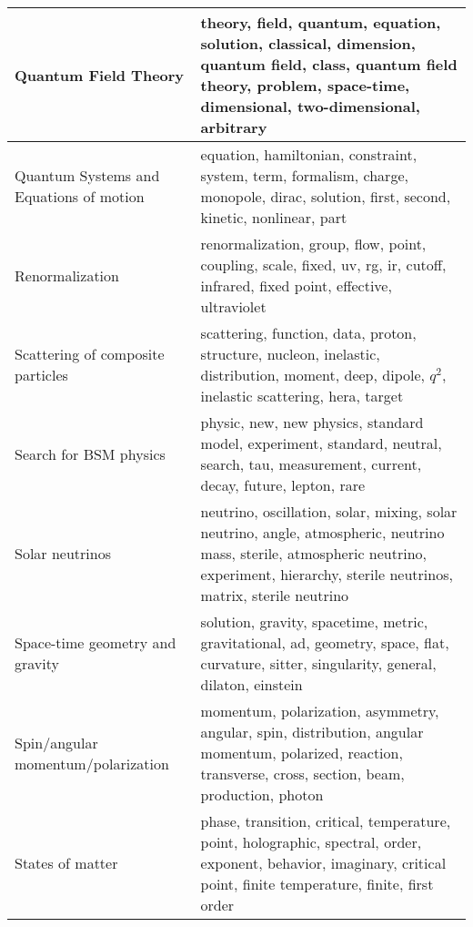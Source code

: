 \begin{longtable}[H]{p{}|p{}}
Quantum Field Theory                                &                                 theory, field, quantum, equation, solution, classical, dimension, quantum field, class, quantum field theory, problem, space-time, dimensional, two-dimensional, arbitrary \\ \midrule
Quantum Systems and Equations of motion             &                                                                     equation, hamiltonian, constraint, system, term, formalism, charge, monopole, dirac, solution, first, second, kinetic, nonlinear, part \\ \midrule
Renormalization                                     &                                                                             renormalization, group, flow, point, coupling, scale, fixed, uv, rg, ir, cutoff, infrared, fixed point, effective, ultraviolet \\ \midrule
Scattering of composite particles                   &                                                           scattering, function, data, proton, structure, nucleon, inelastic, distribution, moment, deep, dipole, $q^2$, inelastic scattering, hera, target \\ \midrule
Search for BSM physics                              &                                                                    physic, new, new physics, standard model, experiment, standard, neutral, search, tau, measurement, current, decay, future, lepton, rare \\ \midrule
Solar neutrinos                                     &                 neutrino, oscillation, solar, mixing, solar neutrino, angle, atmospheric, neutrino mass, sterile, atmospheric neutrino, experiment, hierarchy, sterile neutrinos, matrix, sterile neutrino \\ \midrule
Space-time geometry and gravity                     &                                                                 solution, gravity, spacetime, metric, gravitational, ad, geometry, space, flat, curvature, sitter, singularity, general, dilaton, einstein \\ \midrule
Spin/angular momentum/polarization                  &                                                momentum, polarization, asymmetry, angular, spin, distribution, angular momentum, polarized, reaction, transverse, cross, section, beam, production, photon \\ \midrule
States of matter                                    &                                      phase, transition, critical, temperature, point, holographic, spectral, order, exponent, behavior, imaginary, critical point, finite temperature, finite, first order \\ \midrule

\end{longtable}
